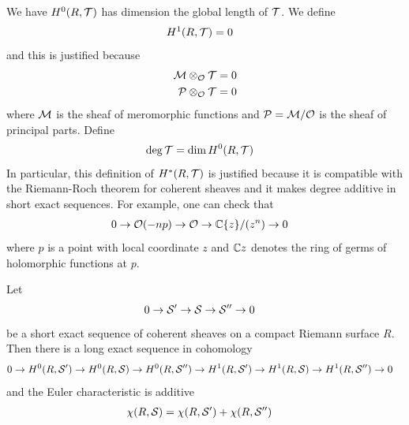 \documentclass[12pt]{article}
\begin{document}
We have $H^0(R,{\mathcal{T}})$ has dimension the global length of ${\mathcal{T}}$. We define \begin{align*}
    H^1(R,{\mathcal{T}}) & = 0
\end{align*} and this is justified because \begin{align*}
    {\mathcal{M}} \otimes_{{\mathcal{O}}} {\mathcal{T}} & = 0 \\
    {\mathcal{P}} \otimes_{{\mathcal{O}}} {\mathcal{T}} & = 0
\end{align*} where ${\mathcal{M}}$ is the sheaf of meromorphic functions and ${\mathcal{P}} = {\mathcal{M}}/{\mathcal{O}}$ is the sheaf of principal parts. Define \begin{align*}
    \deg {\mathcal{T}} & = \dim H^0(R,{\mathcal{T}})
\end{align*} In particular, this definition of $H^*(R,{\mathcal{T}})$ is justified because it is compatible with the Riemann-Roch theorem for coherent sheaves and it makes degree additive in short exact sequences. For example, one can check that \begin{align*}
    0 \to {\mathcal{O}}(-np) \to {\mathcal{O}} & \to \mathbb{C}\{z\}/(z^n) \to 0
\end{align*} where $p$ is a point with local coordinate $z$ and $\mathbb{C}{z}$ denotes the ring of germs of holomorphic functions at $p$. 

\begin{theorem}\label{theorem:long_exact_sequence_cohomology}
    Let \begin{align*}
        0 \to {\mathcal{S}}' & \to {\mathcal{S}} \to {\mathcal{S}}'' \to 0
    \end{align*} be a short exact sequence of coherent sheaves on a compact Riemann surface $R$. Then there is a long exact sequence in cohomology \begin{align*}
        0 \to H^0(R,{\mathcal{S}}') & \to H^0(R,{\mathcal{S}}) \to H^0(R,{\mathcal{S}}'') \to H^1(R,{\mathcal{S}}') \to H^1(R,{\mathcal{S}}) \to H^1(R,{\mathcal{S}}'') \to 0
    \end{align*} and the Euler characteristic is additive \begin{align*}
        \chi(R,{\mathcal{S}}) & = \chi(R,{\mathcal{S}}') + \chi(R,{\mathcal{S}}'')
    \end{align*}
\end{theorem}
\end{document}
